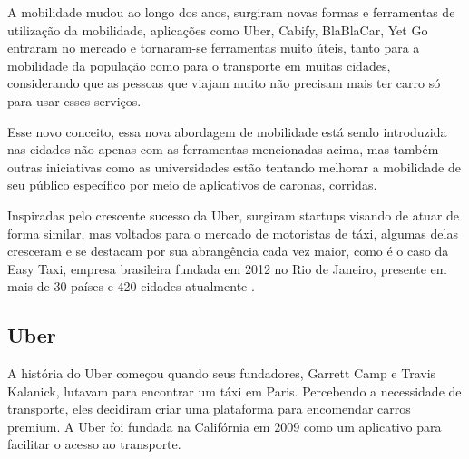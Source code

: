 A mobilidade mudou ao longo dos anos, surgiram novas formas e ferramentas de utilização da mobilidade, aplicações como Uber, Cabify, BlaBlaCar, Yet Go entraram no mercado e tornaram-se ferramentas muito úteis, tanto para a mobilidade da população como para o transporte em muitas cidades, considerando que as pessoas que viajam muito não precisam mais ter carro só para usar esses serviços.%

Esse novo conceito, essa nova abordagem de mobilidade está sendo introduzida nas cidades não apenas com as ferramentas mencionadas acima, mas também outras iniciativas como as universidades estão tentando melhorar a mobilidade de seu público específico por meio de aplicativos de caronas, corridas.

Inspiradas pelo crescente sucesso da Uber, surgiram startups visando de atuar de forma similar, mas voltados para o mercado de motoristas de táxi, algumas delas cresceram e se destacam por sua abrangência cada vez maior, como é o caso da Easy Taxi, empresa brasileira fundada em 2012 no Rio de Janeiro, presente em mais de 30 países e 420 cidades atualmente \cite{caronae}.

\subsection{Uber}
A história do Uber começou quando seus fundadores, Garrett Camp e Travis Kalanick, lutavam para encontrar um táxi em Paris. Percebendo a necessidade de transporte, eles decidiram criar uma plataforma para encomendar carros premium. A Uber foi fundada na Califórnia em 2009 como um aplicativo para facilitar o acesso ao transporte. 

